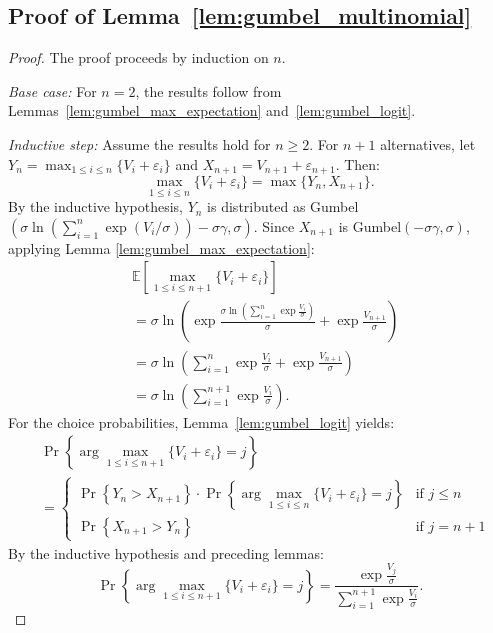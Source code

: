\documentclass[12pt]{article}
\theoremstyle{plain}
\begin{document}
\subsection{Proof of Lemma~\ref{lem:gumbel_multinomial}}
\label{app:proof_gumbel_multinomial}

\begin{proof}
	The proof proceeds by induction on $n$.

	\textit{Base case:} For $n = 2$, the results follow from Lemmas~\ref{lem:gumbel_max_expectation} and~\ref{lem:gumbel_logit}.

	\textit{Inductive step:} Assume the results hold for $n \geq 2$. For $n+1$ alternatives, let $Y_n = \max_{1\le i\le n} \{V_i + \varepsilon_i\}$ and $X_{n+1} = V_{n+1} + \varepsilon_{n+1}$. Then:
	\begin{equation*}
		\max_{1\le i \le n} \{V_i + \varepsilon_i\} = \max\{Y_n, X_{n+1}\}.
	\end{equation*}
	By the inductive hypothesis, $Y_n$ is distributed as Gumbel$(\sigma
		\ln(\sum_{i=1}^n \exp(V_i/\sigma)) - \sigma\gamma, \sigma)$. Since $X_{n+1}$ is
	Gumbel$(-\sigma\gamma, \sigma)$, applying Lemma
	\ref{lem:gumbel_max_expectation}:
	\begin{align*}
		 & \mathbb{E}\left[\max_{1\le i \le n+1} \{V_i + \varepsilon_i\}\right]                                                                \\
		 & = \sigma \ln\left(\exp\frac{\sigma \ln\left(\sum_{i=1}^n \exp\frac{V_i}{\sigma}\right)}{\sigma} + \exp\frac{V_{n+1}}{\sigma}\right) \\
		 & = \sigma \ln\left(\sum_{i=1}^n \exp\frac{V_i}{\sigma} + \exp\frac{V_{n+1}}{\sigma}\right)                                           \\
		 & = \sigma \ln\left(\sum_{i=1}^{n+1} \exp\frac{V_i}{\sigma}\right).
	\end{align*}
	For the choice probabilities, Lemma~\ref{lem:gumbel_logit} yields:
	\begin{align*}
		 & \Pr\left\{\arg\max_{1 \le i \le n+1} \{V_i + \varepsilon_i\} = j\right\}                                                            \\
		 & = \begin{cases}
			     \Pr\left\{Y_n > X_{n+1}\right\} \cdot \Pr\left\{\arg\max_{1\le i \le n} \{V_i + \varepsilon_i\} = j\right\} & \text{if } j \leq n \\
			     \Pr\left\{X_{n+1} > Y_n\right\}                                                                             & \text{if } j = n+1
		     \end{cases}
	\end{align*}
	By the inductive hypothesis and preceding lemmas:
	\begin{equation*}
		\Pr\left\{\arg\max_{1\le i \le n+1} \{V_i + \varepsilon_i\} = j\right\} = \frac{\exp\frac{V_j}{\sigma}}{\sum_{i=1}^{n+1} \exp\frac{V_i}{\sigma}}.
	\end{equation*}
\end{proof}
\end{document}

